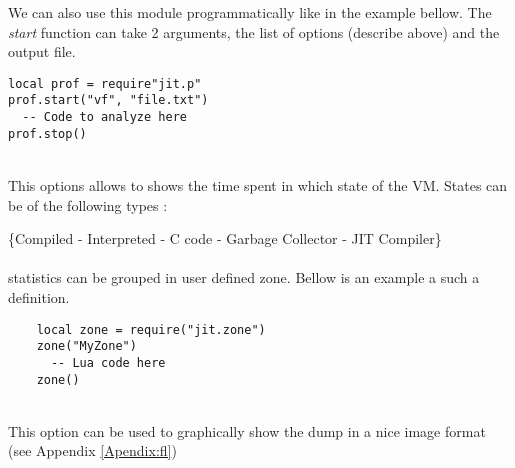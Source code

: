 We can also use this module programmatically like in the example bellow. The
\emph{start} function can take 2 arguments, the list of options (describe above)
and the output file.
\begin{lstlisting}[style=LuaStyle]
local prof = require"jit.p"
prof.start("vf", "file.txt")
  -- Code to analyze here
prof.stop()
\end{lstlisting}

\\
This options allows to shows the time spent in which state of the VM.
States can be of the following types :

\{Compiled - Interpreted - C code - Garbage Collector - JIT Compiler\} \\

\\
statistics can be grouped in user defined zone. Bellow is an example a such a
definition.
\begin{lstlisting}
    local zone = require("jit.zone")
    zone("MyZone")
      -- Lua code here
    zone()
\end{lstlisting}

\\
This option can be used to graphically show the dump in a nice image format
(see Appendix \ref{Apendix:fl})